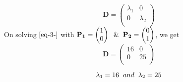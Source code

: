\documentclass[journal,12pt,twocolumn]
{IEEEtran}
\let\vec\mathbf
\newcommand{\myvec}[1]{\ensuremath{\begin{pmatrix}#1\end{pmatrix}}}
\begin{document}
\begin{equation}
\vec{D} = \begin{pmatrix} 
	\lambda_1 & 0 \\
	0 & \lambda_2 \\
	\end{pmatrix} 
\label{eq-4-}
\end{equation}
On solving $\eqref{eq-3-}$ with $\vec{P_1} = \myvec{1 \\ 0} \hspace{2mm} \& \hspace{2mm} \vec{P_2} = \myvec{0 \\ 1}$, we get
\begin{equation}
\vec{D} = \begin{pmatrix} 
	16 & 0 \\
	0 & 25 \\
	\end{pmatrix}
\label{eq-5-}
\end{equation}

\begin{equation}
\lambda_1 = 16 \hspace{2mm} and \hspace{2mm} \lambda_2 = 25
\label{eq-6-}
\end{equation}
\end{document}
